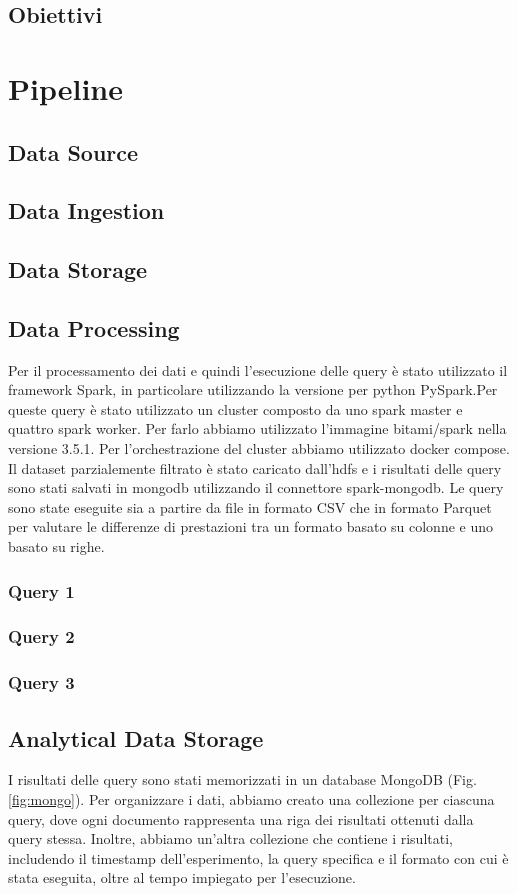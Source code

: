 \documentclass[conference]{IEEEtran}
\begin{document}
\subsection{Obiettivi}
\section{Pipeline}
\subsection{Data Source}
\subsection{Data Ingestion}
\subsection{Data Storage}
\subsection{Data Processing}
Per il processamento dei dati e quindi l'esecuzione delle query è stato utilizzato il framework Spark, in particolare utilizzando la versione per python PySpark.Per queste query è stato utilizzato un cluster composto da uno spark master e quattro spark worker. Per farlo abbiamo utilizzato l'immagine bitami/spark nella versione 3.5.1. Per l'orchestrazione del cluster abbiamo utilizzato docker compose.
Il dataset parzialemente filtrato è stato caricato dall'hdfs e i risultati delle query sono stati salvati in mongodb utilizzando il connettore spark-mongodb.
Le query sono state eseguite sia a partire da file in formato CSV che in formato Parquet per valutare le differenze di prestazioni tra un formato basato su colonne e uno basato su righe.
\subsubsection{Query 1}
\subsubsection{Query 2}
\subsubsection{Query 3}
\subsection{Analytical Data Storage}
I risultati delle query sono stati memorizzati in un database MongoDB (Fig. \ref{fig:mongo}).
Per organizzare i dati, abbiamo creato una collezione per ciascuna query, dove ogni documento rappresenta una riga dei risultati ottenuti dalla query stessa. Inoltre, abbiamo un'altra collezione che contiene i risultati, includendo il timestamp dell'esperimento, la query specifica e il formato con cui è stata eseguita, oltre al tempo impiegato per l'esecuzione.
\end{document}
